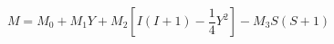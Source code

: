 \begin{equation}
M = M_{0} + M_{1} Y + M_{2} [ I(I+1) - \frac{1}{4} Y^{2}] - M_{3} S(S+1) 
\end{equation}

